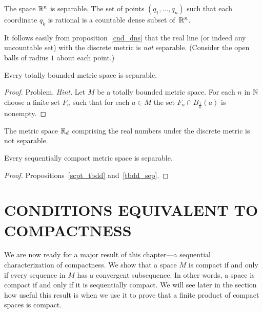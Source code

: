 \begin{exam} The space $\mathbb{R}^n$ is separable.  The set of points $(q_1, \dots, q_n)$ such that
each coordinate $q_k$ is rational is a countable dense subset of~$\mathbb{R}^n$.
\end{exam}

\begin{exam} It follows easily from proposition~\ref{cnd_dns} that the real line (or indeed any
uncountable set) with the discrete metric is \emph{not} separable. (Consider the open balls of
radius $1$ about each point.)
\end{exam}

\begin{prop}\label{tbdd_sep} Every totally bounded metric space is separable.
\end{prop}

\begin{proof} Problem.  \emph{Hint.} Let $M$ be a totally bounded metric space.  For each $n$
in $\mathbb{N}$ choose a finite set $F_n$ such that for each $a \in M$ the set $F_n \cap
B_{\frac1n}(a)$ is nonempty.   \ns
\end{proof}

\begin{prob} The metric space $\mathbb{R}_d$ comprising the real numbers under the discrete metric is
not separable.
\end{prob}

\begin{cor}\label{scpt_sep} Every sequentially compact metric space is separable.
\end{cor}

\begin{proof} Propositions~\ref{scpt_tbdd} and~\ref{tbdd_sep}.
\end{proof}







\section{CONDITIONS EQUIVALENT TO COMPACTNESS}
We are now ready for a major result of this chapter---a sequential characterization of
compactness.  We show that a space $M$ is compact if and only if every sequence in $M$ has a
convergent subsequence. In other words, a space is compact if and only if it is sequentially
compact. We will see later in the section how useful this result is when we use it to prove
that a finite product of compact spaces is compact.

